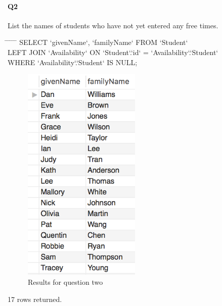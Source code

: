 \documentclass[paper=a4, fontsize=11pt]{scrartcl} %
\numberwithin{equation}{section} %
\numberwithin{figure}{section} %
\numberwithin{table}{section} %
\begin{document}
    \paragraph{Q2}List the names of students who have not yet entered any free times.
    \begin{center}
        \begin{minipage}{10cm}
        \begin{tabbing}
            \hspace*{.25in} \= \hspace*{.25in} \= \hspace*{.25in} \= \hspace*{.25in} \= \hspace*{.25in} \=\kill
            {\color{blue}SELECT `givenName`, `familyName` FROM `Student`}\\
            \> {\color{blue}LEFT JOIN `Availability` ON `Student`.`id` = `Availability`.`Student`} \\
            \> {\color{blue}WHERE `Availability`.`Student` IS NULL;}
        
        \end{tabbing}
        \end{minipage}
    \end{center}
    \begin{figure}[htbp!]
        \centering
        \includegraphics[width=0.5\textwidth]{q22.png}
        \caption{Results for question two}%
        \vspace{-1em}
    \end{figure}
    \newpage
    {\color{red} 17 rows returned.}
\end{document}
